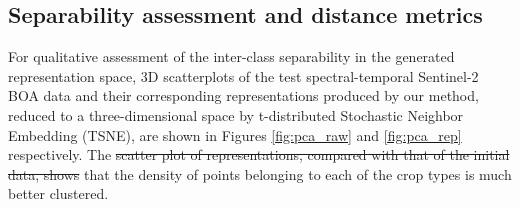 \documentclass[journal,article,submit,pdftex,moreauthors]{Definitions/mdpi}
\providecommand{\DIFadd}[1]{{\protect\color{blue}\uwave{#1}}} %
\providecommand{\DIFdel}[1]{{\protect\color{red}\sout{#1}}}                      %
\providecommand{\DIFaddbegin}{} %
\providecommand{\DIFaddend}{} %
\providecommand{\DIFdelbegin}{} %
\providecommand{\DIFdelend}{} %
\begin{document}
\subsection{Separability assessment and distance metrics}
For qualitative assessment of the inter-class separability in the generated representation space, 3D scatterplots of the test spectral-temporal Sentinel-2 \ac{BOA} data and their corresponding representations produced by our method, reduced to a three-dimensional space by t-distributed Stochastic Neighbor Embedding (TSNE), are shown in Figures \ref{fig:pca_raw} and \ref{fig:pca_rep} respectively.
The \DIFdelbegin \DIFdel{scatter plot of representations, compared with that of the initial data, shows }\DIFdelend \DIFaddbegin \DIFadd{figures show }\DIFaddend that the density of points belonging to each of the crop types is much better clustered.
\end{document}
